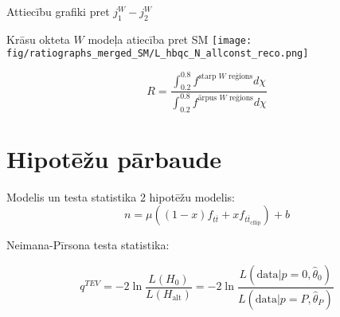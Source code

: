 \documentclass{beamer}
\newcommand{\PW}{$W$\xspace}
\begin{document}
\begin{frame}{Attiecību grafiki}
  pret $j_{1}^{W}-j_{2}^{W}$
  \def\twidth{0.33}
  \setcounter{subfigure}{0}
  \begin{figure}[hbtp]
    \centering
  \end{figure}
\end{frame}

\begin{frame}{Krāsu okteta $W$ modeļa atiecība pret SM}
  \centering
  \texttt{[image: fig/ratiographs\_merged\_SM/L\_hbqc\_N\_allconst\_reco.png]}
\end{frame}

\begin{frame}
  \centering
  \begin{equation*}
    R=\frac{\int_{0.2}^{0.8}f^{\text{starp \PW reģions}}d\chi}{\int_{0.2}^{0.8}f^{\text{ārpus \PW reģions}}d\chi}
  \end{equation*}

  \scriptsize
  
\end{frame}

\section{Hipotēžu pārbaude}

\begin{frame}{Modelis un testa statistika}
  2 hipotēžu modelis:
  \begin{equation*}
    n=\mu\left(\left(1-x\right)f_{t\overline{t}} + xf_{t\overline{t}_{\text{cflip}}}\right) + b
    \label{eq:two_hypo_model}
  \end{equation*}

  Neimana-Pīrsona testa statistika:

  \begin{equation*}
    q^{TEV}=-2\ln{\frac{L(H_{0})}{L(H_{\text{alt}})}}=-2\ln{\frac{L\left(\text{data}|p=0,\hat{\theta}_{0}\right)}{L\left(\text{data}|p=P,\hat{\theta}_{P}\right)}}
  \end{equation*}
  \end{frame}
\end{document}
